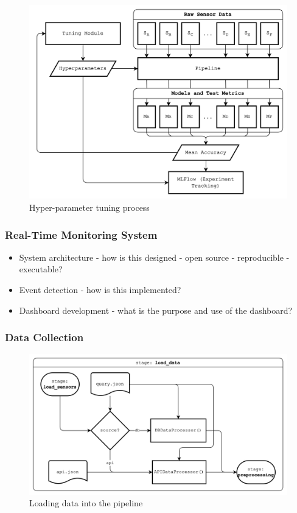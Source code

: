 \begin{figure}[H]
    \centering
    \includegraphics[width=\textwidth]{figures/methodology/hyperparameter_tuning.png}
    \caption{Hyper-parameter tuning process}
    \label{fig:hyperparameter_tuning}
\end{figure}

\subsubsection{Real-Time Monitoring System}
\begin{itemize}
    \item System architecture - how is this designed - open source - reproducible - executable?
    \item Event detection  - how is this implemented?
    \item Dashboard development - what is the purpose and use of the dashboard?
\end{itemize}

\subsubsection{Data Collection}

\begin{figure}[H]
    \centering
    \includegraphics[width=\textwidth]{figures/methodology/load_data_stage.png}
    \caption{Loading data into the pipeline}
    \label{fig:load_data}
\end{figure}

